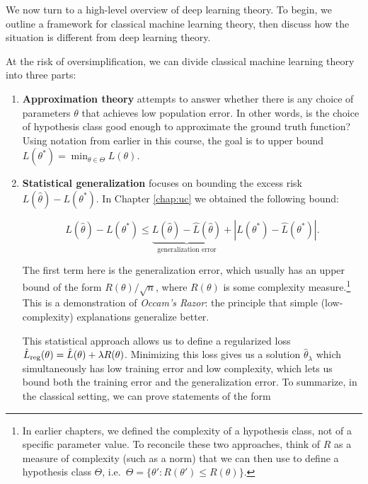 \setcounter{section}{0}


We now turn to a high-level overview of deep learning theory. To begin, we outline a framework for classical machine learning theory, then discuss how the situation is different from deep learning theory.

At the risk of oversimplification, we can divide classical machine learning theory into three parts:

\begin{enumerate}
\item {\bf Approximation theory} attempts to answer whether there is any choice of parameters $\theta$ that achieves low population error. In other words, is the choice of hypothesis class good enough to approximate the ground truth function? Using notation from earlier in this course, the goal is to upper bound $L(\theta^*) = \min_{\theta \in \Theta} L(\theta).$
    
\item {\bf Statistical generalization} focuses on bounding the excess risk $L(\hat{\theta}) - L(\theta^*)$. In Chapter \ref{chap:uc} we obtained the following bound:
    
\begin{equation}
L(\hat{\theta})-L(\theta^*)\leq \underbrace{L(\hat{\theta})-\hat{L}(\hat{\theta})}_{\text{generalization error}} + |L(\theta^*)-\hat{L}(\theta^*)|.
\end{equation}
    
The first term here is the generalization error, which usually has an upper bound of the form $R(\theta)/\sqrt{n}$, where $R(\theta)$ is some complexity measure.\footnote{In earlier chapters, we defined the complexity of a hypothesis class, not of a specific parameter value. To reconcile these two approaches, think of $R$ as a measure of complexity (such as a norm) that we can then use to define a hypothesis class $\Theta$, i.e.~$\Theta = \{\theta' : R(\theta') \le R(\theta)\}$.} This is a demonstration of \textit{Occam's Razor}: the principle that simple (low-complexity) explanations generalize better. 
    
This statistical approach allows us to define a regularized loss  $\hat{L}_{\textup{reg}}(\theta)=\hat{L}(\theta)+\lambda R(\theta)$. Minimizing this loss gives us a solution $\hat{\theta}_\lambda$ which simultaneously has low training error and low complexity, which lets us bound both the training error and the generalization error. To summarize, in the classical setting, we can prove statements of the form
    

\end{enumerate}
